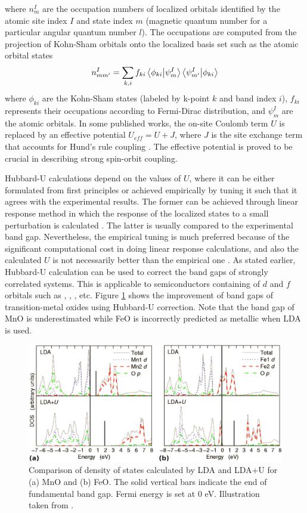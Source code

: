 where $n^I_{m}$ are the occupation numbers of localized orbitals identified by the atomic site index $I$ and state index $m$ (magnetic quantum number for a particular angular quantum number $l$). The occupations are computed from the projection of Kohn-Sham orbitals onto the localized basis set such as the atomic orbital states \citep{Himmetoglu2011}
\begin{equation}
	n^I_{mm'} = \sum_{k,i} f_{ki} \braket{\phi_{ki}}{\psi^I_m} \braket{\psi^I_{m'}}{\phi_{ki}}
\end{equation}
where $\phi_{ki}$ are the Kohn-Sham states (labeled by k-point $k$ and band index $i$), $f_{ki}$ represents their occupations according to Fermi-Dirac distribution, and $\psi^I_{m}$ are the atomic orbitals. In some published works, the on-site  Coulomb term $U$ is replaced by an effective potential $U_{eff} =U + J $, where $J$ is the  site exchange term that accounts for Hund's rule coupling \citep{Liechtenstein1995,Dudarev1998}. The 
effective potential is proved to be crucial in describing strong spin-orbit coupling. 

Hubbard-U calculations depend on the values of $U$, where it can be either formulated from first principles or achieved empirically by tuning it such that it agrees with the experimental results. The former can be achieved through linear response method in which the response of  the localized states to a small perturbation is calculated \citep{Cococcioni2005,Kulik2006}. The latter is usually compared to the experimental band gap. Nevertheless, the empirical tuning is much preferred because of the significant computational cost in doing linear response calculations, and also the calculated $U$ is not necessarily better than the empirical one \citep{Dompablo2011}. As stated earlier, Hubbard-U calculation can be used to correct the band gaps of strongly correlated systems. This is applicable to semiconductors containing of $d$ and $f$ orbitals such as , , , etc. Figure \ref{fig:hubbard} shows the improvement of band gaps of transition-metal oxides using Hubbard-U correction. Note that the band gap of MnO is underestimated while FeO is incorrectly predicted as metallic when LDA is used. 

\begin{figure}[tbh!]
	\centering
	\includegraphics[width=0.8\linewidth]{"images/theory/hubbard"}
	\caption[Improvement of band gap under Hubbard Correction]{Comparison of density of states calculated by LDA and LDA+U for (a) MnO and (b) FeO. The solid vertical bars indicate the end of fundamental band gap. Fermi energy is set at 0 eV. Illustration taken from \citep{Tran2006}.}
	\label{fig:hubbard}
\end{figure}

